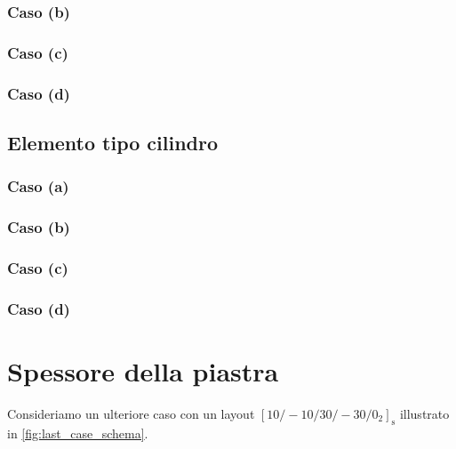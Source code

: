 \documentclass[a4paper,num-refs]{oup-contemporary}
\begin{document}
\textcolor{blue}{\lipsum[1-2]}


\subsubsection{Caso (b)}
\textcolor{blue}{\lipsum[1-2]}
\subsubsection{Caso (c)}
\textcolor{blue}{\lipsum[1-2]}
\subsubsection{Caso (d)}
\textcolor{blue}{\lipsum[1-2]}

\subsection{Elemento tipo cilindro}

\subsubsection{Caso (a)}
\textcolor{blue}{\lipsum[1-2]}
\subsubsection{Caso (b)}
\label{sec:cyl_B}
\textcolor{blue}{\lipsum[1-2]}
\subsubsection{Caso (c)}
\label{sec:cyl_C}
\textcolor{blue}{\lipsum[1-2]}
\subsubsection{Caso (d)}
\label{sec:cyl_D}
\textcolor{blue}{\lipsum[1-2]}


\section{Spessore della piastra}

Consideriamo un ulteriore caso con un layout $[10 /-10 / 30 /-30 / 0_2]_{\mathrm{s}}$ illustrato in \cref{fig:last_case_schema}. 
\end{document}
